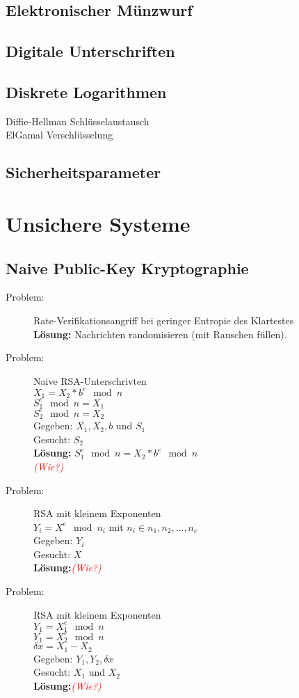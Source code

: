 \documentclass[10pt,a4paper]{article}
\begin{document}
\subsection{Elektronischer Münzwurf}
\subsection{Digitale Unterschriften}
\subsection{Diskrete Logarithmen}
Diffie-Hellman Schlüsselaustausch\\
ElGamal Verschlüsselung
\subsection{Sicherheitsparameter}
\section{Unsichere Systeme}
\subsection{Naive Public-Key Kryptographie}
\begin{description}
	\item[Problem:] Rate-Verifikationsangriff bei geringer Entropie des Klartestes\\
\textbf{Lösung:} Nachrichten randomisieren (mit Rauschen füllen).
	\item[Problem:] Naive RSA-Unterschrivten\\
$X_1 = X_2 * b^e \mod n$\\
$S_1^e \mod n = X_1$\\
$S_2^e \mod n = X_2$\\
Gegeben: $X_1, X_2, b$ und $S_1$\\
Gesucht: $S_2$\\
\textbf{Lösung:} $S_1^e \mod n = X_2 * b^e \mod n$\\
\textit{\textcolor{red}{(Wie?)}}
	\item[Problem:]RSA mit kleinem Exponenten\\
$Y_i = X^e \mod n_i$ mit $n_i \in {n_1,n_2,\dots,n_e}$\\
Gegeben: $Y_i$\\
Gesucht: $X$\\
\textbf{Lösung:}\textit{\textcolor{red}{(Wie?)}}
	\item[Problem:]RSA mit kleinem Exponenten\\
$Y_1 = X_1^e \mod n$\\
$Y_1 = X_2^e \mod n$\\
$\delta x = X_1 - X_2$\\
Gegeben: $Y_1,Y_2,\delta x$\\
Gesucht: $X_1$ und $X_2$\\
\textbf{Lösung:}\textit{\textcolor{red}{(Wie?)}}
\end{description}
\end{document}
